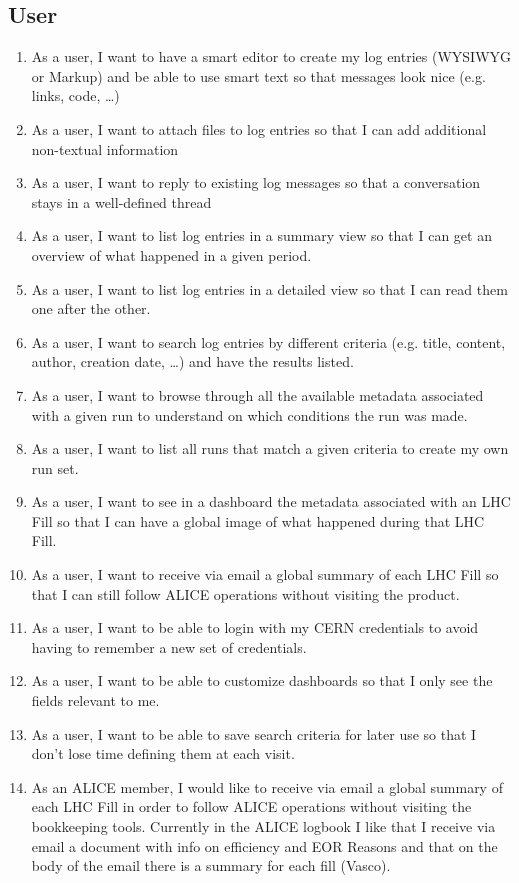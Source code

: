 \documentclass[a4paper,11pt]{book}
\begin{document}
\subsection{User}
\begin{enumerate}
  \item As a user, I want to have a smart editor to create my log entries (WYSIWYG or Markup) and be able to use smart text so that messages look nice (e.g. links, code, …) 
  \item As a user, I want to attach files to log entries so that I can add additional non-textual information
  \item As a user, I want to reply to existing log messages so that a conversation stays in a well-defined thread
  \item As a user, I want to list log entries in a summary view so that I can get an overview of what happened in a given period.
  \item As a user, I want to list log entries in a detailed view so that I can read them one after the other.
  \item As a user, I want to search log entries by different criteria (e.g. title, content, author, creation date, …) and have the results listed. 
  \item As a user, I want to browse through all the available metadata associated with a given run to understand on which conditions the run was made. 
  \item As a user, I want to list all runs that match a given criteria to create my own run set. 
  \item As a user, I want to see in a dashboard the metadata associated with an LHC Fill so that I can have a global image of what happened during that LHC Fill. 
  \item As a user, I want to receive via email a global summary of each LHC Fill so that I can still follow ALICE operations without visiting the product. 
  \item As a user, I want to be able to login with my CERN credentials to avoid having to remember a new set of credentials. 
  \item As a user, I want to be able to customize dashboards so that I only see the fields relevant to me. 
  \item As a user, I want to be able to save search criteria for later use so that I don’t lose time defining them at each visit. 
  \item As an ALICE member, I would like to receive via email a global summary of each LHC Fill in order to follow ALICE operations without visiting the bookkeeping tools. Currently in the ALICE logbook I like that I receive via email a document with info on efficiency and EOR Reasons and that on the body of the email there is a summary for each fill (Vasco).

\end{enumerate}
\end{document}

